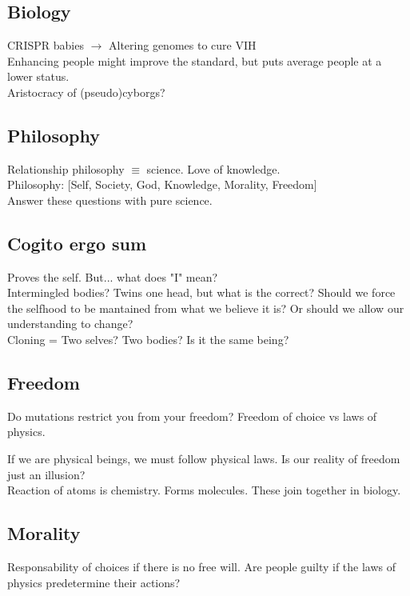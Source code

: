 \documentclass{article}
\begin{document}
	\section{}
	\subsection{Biology}
		CRISPR babies $\rightarrow$ Altering genomes to cure VIH \\
		Enhancing people might improve the standard, but puts average people at a lower status. \\
		Aristocracy of (pseudo)cyborgs?
		
	\subsection{Philosophy}
		Relationship philosophy $\equiv$ science. Love of knowledge. \\
		Philosophy: [Self, Society, God, Knowledge, Morality, Freedom] \\
		Answer these questions with pure science.
	
	\subsection{Cogito ergo sum}
		Proves the self. But... what does "I" mean? \\
		Intermingled bodies? Twins one head, but what is the correct? Should we force the selfhood to be mantained from what we believe it is? Or should we allow our understanding to change? \\
		Cloning = Two selves? Two bodies? Is it the same being?

	\subsection{Freedom}
		Do mutations restrict you from your freedom? 
		Freedom of choice vs laws of physics.

		If we are physical beings, we must follow physical laws. Is our reality of freedom just an illusion? \\
		Reaction of atoms is chemistry. Forms molecules. These join together in biology. 

	\subsection{Morality}
		Responsability of choices if there is no free will. Are people guilty if the laws of physics predetermine their actions?
\end{document}
